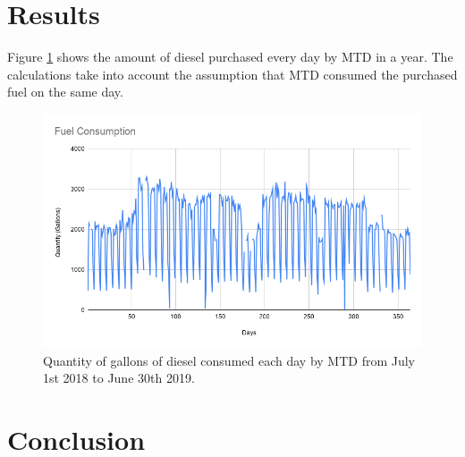 \documentclass{anstrans}
\begin{document}
\section{Results}

Figure \ref{fig:mtdfuel} shows the amount of diesel purchased every day by MTD in a year. The calculations take into account the assumption that MTD consumed the purchased fuel on the same day.

\begin{figure}[]
	\centering
	\includegraphics[width=0.4\linewidth]{figures/fuelconsumption.png}
	\hfill
	\caption{Quantity of gallons of diesel consumed each day by MTD from July 1st 2018 to June 30th 2019.}
	\label{fig:mtdfuel}
\end{figure}

\section{Conclusion}



\end{document}
